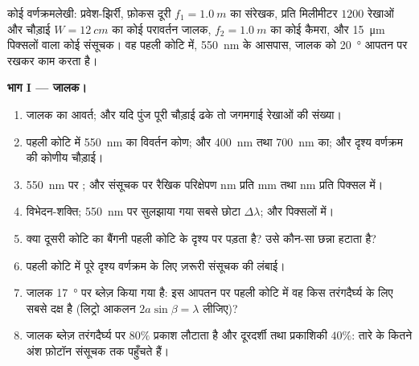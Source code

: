 \begin{problem}
\label{pb:b2:gratings:1}

कोई वर्णक्रमलेखी: प्रवेश-झिर्री, फ़ोकस दूरी $f_1 =
\qty{1.0}{m}$ का संरेखक, प्रति मिलीमीटर $1200$ रेखाओं और चौड़ाई $W =
\qty{12}{cm}$ का कोई परावर्तन जालक, $f_2 = \qty{1.0}{m}$ का कोई कैमरा, और \qty{15}{\micro m}
पिक्सलों वाला कोई संसूचक। वह पहली कोटि में, \qty{550}{nm} के आसपास,
जालक को \qty{20}{\degree} आपतन पर रखकर काम करता है।

\medskip
\noindent\textbf{भाग I --- जालक।}
\begin{enumerate}
  \item जालक का आवर्त; और यदि पुंज पूरी चौड़ाई ढके तो जगमगाई
        रेखाओं की संख्या।
  \item पहली कोटि में \qty{550}{nm} का विवर्तन कोण; और \qty{400}{nm} तथा
        \qty{700}{nm} का; और दृश्य वर्णक्रम की कोणीय
        चौड़ाई।
  \item \qty{550}{nm} पर ; और संसूचक पर रैखिक परिक्षेपण
        nm प्रति mm तथा nm प्रति पिक्सल में।
  \item विभेदन-शक्ति; \qty{550}{nm} पर सुलझाया गया सबसे छोटा $\Delta\lambda$; और
        पिक्सलों में।
  \item क्या दूसरी कोटि का बैंगनी पहली कोटि के दृश्य पर पड़ता है?
        उसे कौन-सा छन्ना हटाता है?
  \item पहली कोटि में पूरे दृश्य वर्णक्रम के लिए ज़रूरी संसूचक की
        लंबाई।
  \item जालक \qty{17}{\degree} पर ब्लेज़ किया गया है: इस आपतन पर पहली कोटि में
        वह किस तरंगदैर्घ्य के लिए सबसे दक्ष है (लिट्रो आकलन
        $2a\sin\beta = \lambda$ लीजिए)?
  \item जालक ब्लेज़ तरंगदैर्घ्य पर $80\%$ प्रकाश लौटाता है और
        दूरदर्शी तथा प्रकाशिकी $40\%$: तारे के कितने अंश फ़ोटॉन
        संसूचक तक पहुँचते हैं।
\end{enumerate}


\end{problem}
